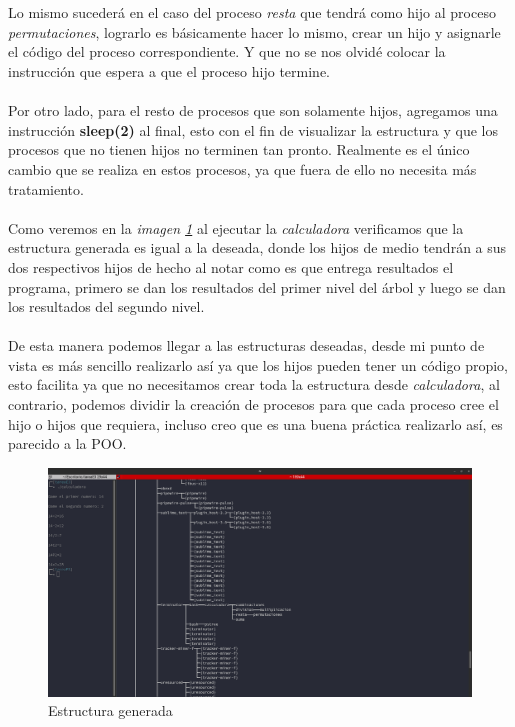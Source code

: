 \documentclass[10pt]{article}
\begin{document}
	\\\\
	Lo mismo sucederá  en el caso del proceso \emph{resta} que tendrá como hijo al proceso \emph{permutaciones}, lograrlo es básicamente hacer lo mismo, crear un hijo y asignarle el código del proceso correspondiente.  Y que no se nos olvidé colocar la instrucción que espera a que el proceso hijo termine. 
	\\\\
	Por otro lado, para el resto de procesos que son solamente hijos, agregamos una instrucción \textbf{sleep(2)} al final, esto con el fin de visualizar la estructura y que los procesos que no tienen hijos no terminen tan pronto. Realmente es el único cambio que se realiza en estos procesos, ya que fuera de ello no necesita más tratamiento. 
	\\\\
	Como veremos en la \emph{imagen \ref{fig:pruebae2}} al ejecutar la \emph{calculadora} verificamos que la estructura generada es igual a la deseada, donde los hijos de medio tendrán a sus dos respectivos hijos de hecho al notar como es que entrega resultados el programa, primero se dan los resultados del primer nivel del árbol y luego se dan los resultados del segundo nivel. 
	\\\\
	De esta manera podemos llegar a las estructuras deseadas, desde mi punto de vista es más sencillo realizarlo así ya que los hijos pueden tener un código propio, esto facilita ya que no necesitamos crear toda la estructura desde \emph{calculadora}, al contrario, podemos dividir la creación de procesos para que cada proceso cree el hijo o hijos que requiera, incluso creo que es una buena práctica realizarlo así, es parecido a la POO.
	\begin{figure}[h!]
		\centering
		\includegraphics[width=\linewidth]{pruebaE2.png}
		\caption{Estructura generada}
		\label{fig:pruebae2}
	\end{figure}

	
	
\end{document}
